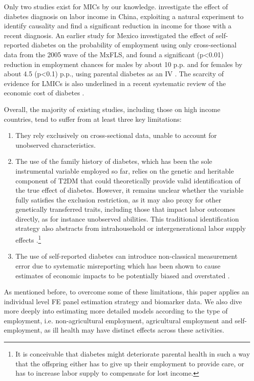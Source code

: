 \documentclass[12pt,english]{article}
\begin{document}
Only two studies exist for \ac{MICs} by our knowledge. \textcite{Liu2014} investigate the effect of diabetes diagnosis on labor income in China, exploiting a natural experiment to identify causality and find a significant reduction in income for those with a recent diagnosis. An earlier study for Mexico investigated the effect of self-reported diabetes on the probability of employment using only cross-sectional data from the 2005 wave of the \ac{MxFLS}, and found a significant (p<0.01) reduction in employment chances for males by about 10 \ac{p.p.} and for females by about 4.5 (p<0.1) \ac{p.p.}, using parental diabetes as an \ac{IV} \parencite{Seuring2015}. The scarcity of evidence for \ac{LMICs} is also underlined in a recent systematic review of the economic cost of diabetes \parencite{Seuring2015a}. 


Overall, the majority of existing studies, including those on high income countries, tend to suffer from at least three key limitations: 
\begin{enumerate}
\item  They rely exclusively on cross-sectional data, unable to account for unobserved characteristics.
\item The use of the family history of diabetes, which has been the sole instrumental variable employed so far, relies on the genetic and heritable component of \ac{T2DM} that could theoretically provide valid identification of the true effect of diabetes. However, it remains unclear whether the variable fully satisfies the exclusion restriction, as it may also proxy for other genetically transferred traits, including those that impact labor outcomes directly, as for instance unobserved abilities. This traditional identification strategy also abstracts from intrahousehold or intergenerational labor supply effects \parencite{Seuring2015}.\footnote{It is conceivable that diabetes might deteriorate parental health in such a way that the offspring either has to give up their employment to provide care, or has to increase labor supply to compensate for lost income.}
\item The use of self-reported diabetes can introduce non-classical measurement error due to systematic misreporting which has been shown to cause estimates of economic impacts to be potentially biased and overstated  \parencite{Cawley2015,ONeill2013,Perks2015}.
\end{enumerate}

As mentioned before, to overcome some of these limitations, this paper applies an individual level \ac{FE} panel estimation strategy and biomarker data. We also dive more deeply into estimating more detailed models according to the type of employment, i.e. non-agricultural employment, agricultural employment and self-employment, as ill health may have distinct effects across these activities.
\end{document}
